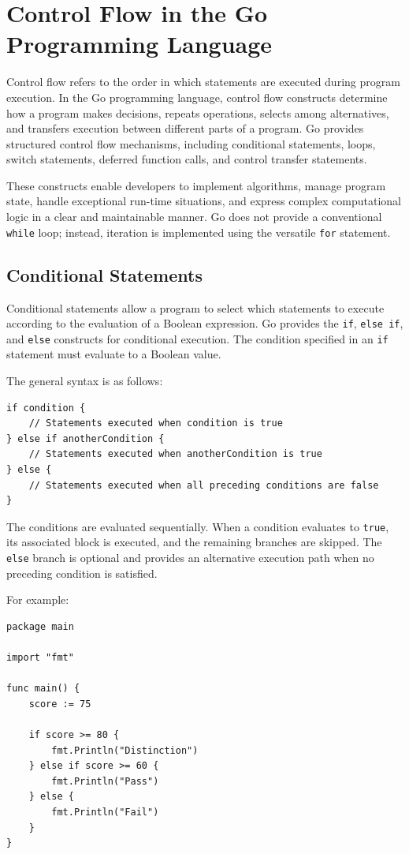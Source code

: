 \section{Control Flow in the Go Programming Language}

Control flow refers to the order in which statements are executed
during program execution. In the Go programming language, control
flow constructs determine how a program makes decisions, repeats
operations, selects among alternatives, and transfers execution
between different parts of a program. Go provides structured
control flow mechanisms, including conditional statements, loops,
switch statements, deferred function calls, and control transfer
statements.

These constructs enable developers to implement algorithms,
manage program state, handle exceptional run-time situations, and
express complex computational logic in a clear and maintainable
manner. Go does not provide a conventional \texttt{while} loop;
instead, iteration is implemented using the versatile
\texttt{for} statement.

\subsection{Conditional Statements}

Conditional statements allow a program to select which statements
to execute according to the evaluation of a Boolean expression.
Go provides the \texttt{if}, \texttt{else if}, and \texttt{else}
constructs for conditional execution. The condition specified
in an \texttt{if} statement must evaluate to a Boolean value.

The general syntax is as follows:

\begin{lstlisting}
if condition {
    // Statements executed when condition is true
} else if anotherCondition {
    // Statements executed when anotherCondition is true
} else {
    // Statements executed when all preceding conditions are false
}
\end{lstlisting}

The conditions are evaluated sequentially. When a condition
evaluates to \texttt{true}, its associated block is executed,
and the remaining branches are skipped. The \texttt{else} branch
is optional and provides an alternative execution path when no
preceding condition is satisfied.

For example:

\begin{lstlisting}
package main

import "fmt"

func main() {
    score := 75

    if score >= 80 {
        fmt.Println("Distinction")
    } else if score >= 60 {
        fmt.Println("Pass")
    } else {
        fmt.Println("Fail")
    }
}
\end{lstlisting}

